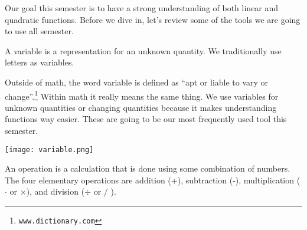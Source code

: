 
Our goal this semester is to have a strong understanding of both linear and quadratic functions. Before we dive in, let's review some of the tools we are going to use all semester. 
\begin{presentation}
\begin{defn}[Variable]
	A variable is a representation for an unknown quantity. We traditionally use letters as variables. 
\end{defn}
\end{presentation}

Outside of math, the word variable is defined as ``apt or liable to vary or change''.\footnote{\texttt{www.dictionary.com}} Within math it really means the same thing. We use variables for unknown quantities or changing quantities because it makes understanding functions way easier. These are going to be our most frequently used tool this semester. 

\begin{center}
\texttt{[image: variable.png]}
\end{center}

\begin{defn}
An operation is a calculation that is done using some combination of numbers. The four elementary operations are addition (+), subtraction (-), multiplication ( $\cdot$ or $\times$), and division ($\div$ or $/$ ).
\end{defn}

%	



